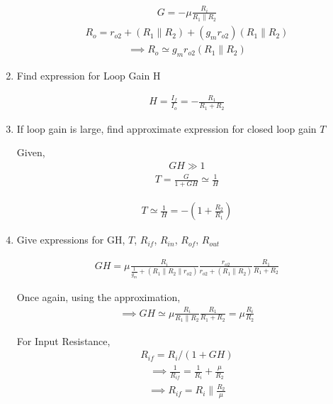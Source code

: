\begin{enumerate}[label=\thesubsection.\arabic*.,ref=\thesubsection.\theenumi]
\begin{align}
    G =-\mu \frac{R_{i}}{R_{1} \| R_{2}}
\end{align}
\begin{align}
    R_{o}=r_{o 2}+(R_{1} \| R_{2})+(g_{m} r_{o 2})(R_{1} \| R_{2})
\end{align}
\begin{align}
    \implies R_{o} \simeq g_{m} r_{o 2}\left(R_{1} \| R_{2}\right)
\end{align}

\item
Find expression for Loop Gain H

\solution
\begin{align}
    H = \frac{I_{f}}{I_{o}}=-\frac{R_{1}}{R_{1}+R_{2}}
\end{align}

\item
If loop gain is large, find approximate expression for closed loop gain $T$

\solution
Given,
\begin{align}
    GH \gg 1
\end{align}
\begin{align}
    T = \frac{G}{1+GH}\simeq \frac{1}{H}
\end{align}


\begin{align}
    T \simeq \frac{1}{H}=-\left(1+\frac{R_{2}}{R_{1}}\right)
\end{align}

\item
Give expressions for GH, $T$, $R_{if}$, $R_{in}$, $R_{of}$, $R_{out}$

\solution
\begin{align}
    GH=\mu \frac{R_{i}}{\frac{1}{g_{m}}+(R_{1}\|R_{2}\| r_{o 2})} \frac{r_{o 2}}{r_{o 2}+(R_{1} \| R_{2})} \frac{R_{1}}{R_{1}+R_{2}}
\end{align}

Once again, using the approximation,
\begin{align}
    \implies GH \simeq \mu \frac{R_{i}}{R_{1} \| R_{2}} \frac{R_{1}}{R_{1}+R_{2}}=\mu \frac{R_{i}}{R_{2}}
\end{align}

For Input Resistance,
\begin{align}
    R_{if}=R_{i} /(1+GH)
\end{align}
\begin{align}
    \implies \frac{1}{R_{i f}}=\frac{1}{R_{i}}+\frac{\mu}{R_{2}}
\end{align}
\begin{align}
    \implies R_{i f}=R_{i} \| \frac{R_{2}}{\mu}
\end{align}


\end{enumerate}
